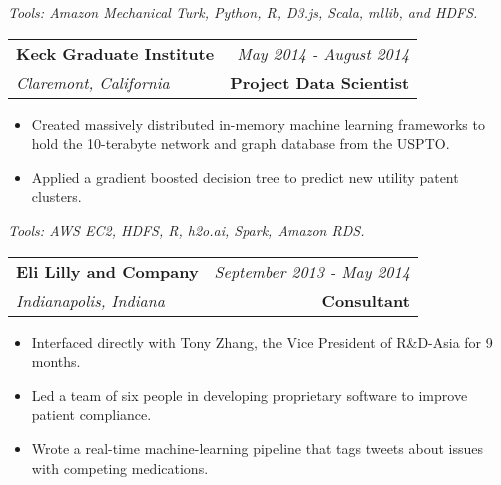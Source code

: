 \documentclass[10pt,a4paper]{article}
\begin{document}
  \vspace*{2mm}\setlength\parindent{2mm}\begin{minipage}{16.8cm}
    \textit{Tools: Amazon Mechanical Turk, Python, R, D3.js, Scala, mllib, and HDFS.}
  \end{minipage}

  \vspace*{3mm}\noindent\begin{tabularx}{17cm}{X r}
    \textbf{Keck Graduate Institute} & \textit{May 2014 - August 2014} \\
    \textit{Claremont, California} & \textbf{Project Data Scientist} 
  \end{tabularx}

  \vspace*{1mm}\noindent\begin{minipage}{17cm}
    \begin{itemize}[leftmargin=6mm,topsep=0mm,itemsep=-1mm]
      \item Created massively distributed in-memory machine learning frameworks to hold the 10-terabyte network and graph database from the USPTO.
      \item Applied a gradient boosted decision tree to predict new utility patent clusters.
    \end{itemize}
  \end{minipage}

  \vspace*{2mm}\setlength\parindent{2mm}\begin{minipage}{16.8cm}
    \textit{Tools: AWS EC2, HDFS, R, h2o.ai, Spark, Amazon RDS.}
  \end{minipage}

  \vspace*{3mm}\noindent\begin{tabularx}{17cm}{X r}
    \textbf{Eli Lilly and Company} & \textit{September 2013 - May 2014} \\
    \textit{Indianapolis, Indiana} & \textbf{Consultant} 
  \end{tabularx}

  \vspace*{1mm}\noindent\begin{minipage}{17cm}
    \begin{itemize}[leftmargin=6mm,topsep=0mm,itemsep=-1mm]
      \item Interfaced directly with Tony Zhang, the Vice President of R\&D-Asia for 9 months.
      \item Led a team of six people in developing proprietary software to improve patient compliance.
      \item Wrote a real-time machine-learning pipeline that tags tweets about issues with competing medications.
    \end{itemize}
  \end{minipage}
\end{document}
